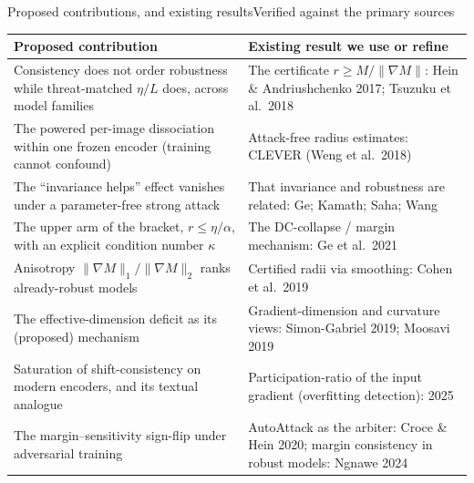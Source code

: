 \documentclass[aspectratio=169,10pt]{beamer}
\newcommand{\etaL}{\ensuremath{\eta/L}}
\newcommand{\tb}[1]{{\color{TUMblue}#1}}
\begin{document}
\begin{frame}{Proposed contributions, and existing results}{Verified against the primary sources}
  \vspace{0.2em}
  \centering\scriptsize
  \begin{tabular}{p{5.8cm}p{5.8cm}}
    \toprule
    \textbf{\color{good}Proposed contribution} & \textbf{\color{slate}Existing result we use or refine}\\
    \midrule
    Consistency does not order robustness while threat-matched $\etaL$ does, across model families &
    The certificate $r\ge M/\lVert\nabla M\rVert$: \tb{Hein \& Andriushchenko 2017; Tsuzuku et al.\ 2018}\\
    The powered per-image dissociation within one frozen encoder (training cannot confound) &
    Attack-free radius estimates: CLEVER \tb{(Weng et al.\ 2018)}\\
    The ``invariance helps'' effect vanishes under a parameter-free strong attack &
    That invariance and robustness are related: \tb{Ge; Kamath; Saha; Wang}\\
    The upper arm of the bracket, $r\le\eta/\alpha$, with an explicit condition number $\kappa$ &
    The DC-collapse / margin mechanism: \tb{Ge et al.\ 2021}\\
    Anisotropy $\lVert\nabla M\rVert_1/\lVert\nabla M\rVert_2$ ranks already-robust models &
    Certified radii via smoothing: \tb{Cohen et al.\ 2019}\\
    The effective-dimension deficit as its (proposed) mechanism &
    Gradient-dimension and curvature views: \tb{Simon-Gabriel 2019; Moosavi 2019}\\
    Saturation of shift-consistency on modern encoders, and its textual analogue &
    Participation-ratio of the input gradient (overfitting detection): \tb{2025}\\
    The margin--sensitivity sign-flip under adversarial training &
    AutoAttack as the arbiter: \tb{Croce \& Hein 2020}; margin consistency in robust models: \tb{Ngnawe 2024}\\
    \bottomrule
  \end{tabular}
\end{frame}
\end{document}
